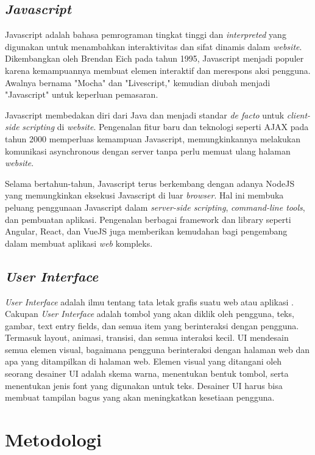 \documentclass[
	a4paper, %
	10pt, %
	unnumberedsections, %
	twoside, %
]{LTJournalArticle}
\begin{document}
\subsection{\textit{Javascript}}
Javascript adalah bahasa pemrograman tingkat tinggi dan \textit{interpreted} yang digunakan untuk menambahkan interaktivitas dan sifat dinamis dalam \textit{website}. Dikembangkan oleh Brendan Eich pada tahun 1995, Javascript menjadi populer karena kemampuannya membuat elemen interaktif dan merespons aksi pengguna. Awalnya bernama "Mocha" dan "Livescript," kemudian diubah menjadi "Javascript" untuk keperluan pemasaran.

Javascript membedakan diri dari Java dan menjadi standar \textit{de facto} untuk \textit{client-side} \textit{scripting} di \textit{website}. Pengenalan fitur baru dan teknologi seperti AJAX pada tahun 2000 memperluas kemampuan Javascript, memungkinkannya melakukan komunikasi asynchronous dengan server tanpa perlu memuat ulang halaman \textit{website}.

Selama bertahun-tahun, Javascript terus berkembang dengan adanya NodeJS yang memungkinkan eksekusi Javascript di luar \textit{browser}. Hal ini membuka peluang penggunaan Javascript dalam \textit{server-side scripting}, \textit{command-line tools}, dan pembuatan aplikasi. Pengenalan berbagai framework dan library seperti Angular, React, dan VueJS juga memberikan kemudahan bagi pengembang dalam membuat aplikasi \textit{web} kompleks.

\subsection{\textit{User Interface}}
\textit{User Interface} adalah ilmu tentang tata letak grafis suatu web atau aplikasi \cite{userinterface1}. Cakupan \textit{User Interface} adalah tombol yang akan diklik oleh pengguna, teks, gambar, text entry fields, dan semua item yang berinteraksi dengan pengguna. Termasuk layout, animasi, transisi, dan semua interaksi kecil. UI mendesain semua elemen visual, bagaimana pengguna berinteraksi dengan halaman web dan apa yang ditampilkan di halaman web. Elemen visual yang ditangani oleh seorang desainer UI adalah skema warna, menentukan bentuk tombol, serta menentukan jenis font yang digunakan untuk teks. Desainer UI harus bisa membuat tampilan bagus yang akan meningkatkan kesetiaan pengguna. 



\section{Metodologi}
\end{document}
